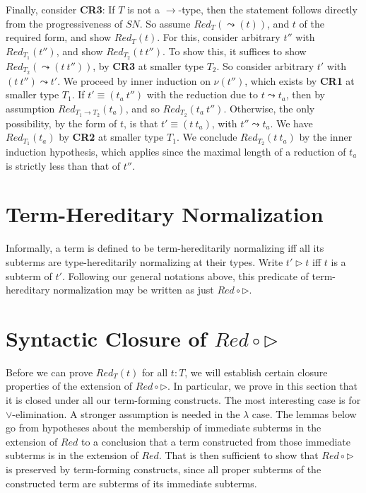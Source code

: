 \documentclass{article}
\newcommand{\red}[0]{\textit{Red}}
\newcommand{\sn}[0]{\textit{SN}}
\begin{document}
Finally, consider \textbf{CR3}: If $T$ is not a $\to$-type, then the
statement follows directly from the progressiveness of $\sn$.  So
assume $\red_T(\leadsto(t))$, and $t$ of the required form, and show
$\red_T(t)$.  For this, consider arbitrary $t''$ with
$\red_{T_1}(t'')$, and show $\red_{T_2}(t\ t'')$.  To show this, it
suffices to show $\red_{T_2}(\leadsto(t\ t''))$, by \textbf{CR3} at
smaller type $T_2$.  So consider arbitrary $t'$ with $(t\ t'')\leadsto
t'$.  We proceed by inner induction on $\nu(t'')$, which exists by
\textbf{CR1} at smaller type $T_1$.  If $t' \equiv (t_a\ t'')$ with
the reduction due to $t\leadsto t_a$, then by assumption $\red_{T_1\to
T_2}(t_a)$, and so $\red_{T_2}(t_a\ t'')$.  Otherwise, the only
possibility, by the form of $t$, is that $t' \equiv (t\ t_a)$, with
$t'' \leadsto t_a$.  We have $\red_{T_1}(t_a)$ by \textbf{CR2} at
smaller type $T_1$.  We conclude $\red_{T_2}(t\ t_a)$ by the inner
induction hypothesis, which applies since the maximal length of a
reduction of $t_a$ is strictly less than that of $t''$.

\section{Term-Hereditary Normalization}

Informally, a term is defined to be term-hereditarily normalizing iff
all its subterms are type-hereditarily normalizing at their types.
Write $t' \rhd t$ iff $t$ is a subterm of $t'$.  Following our general
notations above, this predicate of term-hereditary normalization may
be written as just $\red \circ \rhd$.

\section{Syntactic Closure of $\red \circ \rhd$}

Before we can prove $\red_T(t)$ for all $t : T$, we will establish
certain closure properties of the extension of $\red \circ \rhd$.  In
particular, we prove in this section that it is closed under all our
term-forming constructs.  The most interesting case is for
$\vee$-elimination.  A stronger assumption is needed in the $\lambda$
case.  The lemmas below go from hypotheses about the membership of
immediate subterms in the extension of $\red$ to a conclusion that a
term constructed from those immediate subterms is in the extension of
$\red$.  That is then sufficient to show that $\red \circ \rhd$ is
preserved by term-forming constructs, since all proper subterms of the
constructed term are subterms of its immediate subterms.
\end{document}
